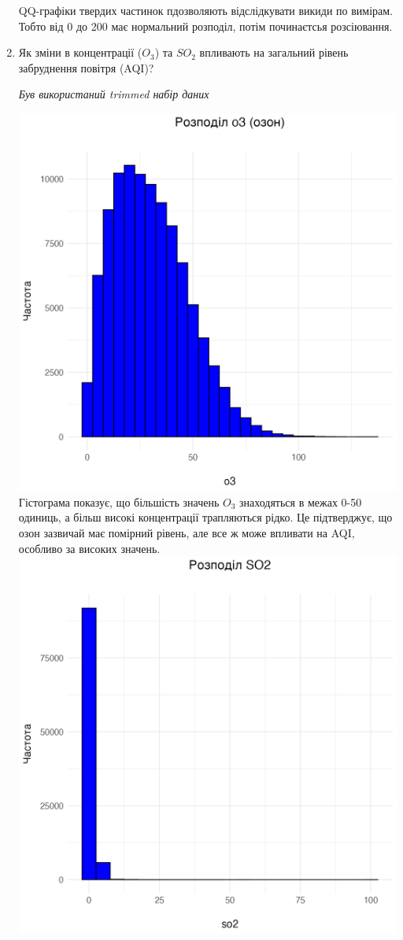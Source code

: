 \documentclass{article}
\begin{document}
\begin{enumerate}
    QQ-графіки твердих частинок пдозволяють відслідкувати викиди по вимірам. Тобто від 0 до 200 має нормальний розподіл, потім починаєтсья розсіювання.
    \item Як зміни в концентрації  ($O_3$)  та $SO_2$ впливають на загальний рівень забруднення повітря (AQI)?
    
    \quad \textit{Був використаний trimmed набір даних}

    \includegraphics[width=6in]{question2/o3_plot.png}
    Гістограма показує, що більшість значень $O_3$ знаходяться в межах 0-50 одиниць, а більш високі концентрації трапляються рідко.
    Це підтверджує, що озон зазвичай має помірний рівень, але все ж може впливати на AQI, особливо за високих значень.
    \includegraphics[width=6in]{question2/so2_plot.png}

\end{enumerate}
\end{document}
